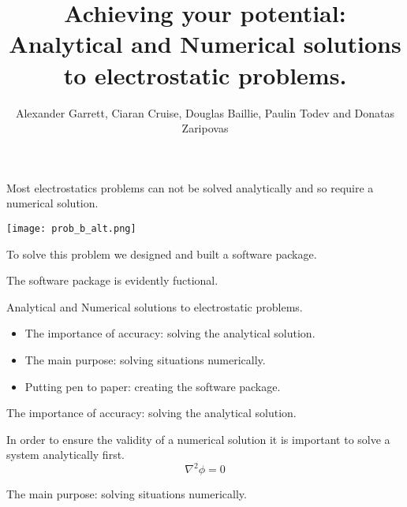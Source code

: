 \documentclass{beamer}
\title{Achieving your potential: Analytical and Numerical solutions to electrostatic problems.}
\author{Alexander Garrett, Ciaran Cruise, Douglas Baillie, Paulin Todev and Donatas Zaripovas}
\begin{document}
\begin{frame}
\titlepage
\end{frame}

\begin{frame}{Most electrostatics problems can not be solved analytically and so require a numerical solution.}
\begin{center}
\texttt{[image: prob\_b\_alt.png]}
\end{center}
\end{frame}

\begin{frame}{To solve this problem we designed and built a software package.}
\end{frame}

\begin{frame}{The software package is evidently fuctional.}
\end{frame}

\begin{frame}{Analytical and Numerical solutions to electrostatic problems.}
\begin{itemize}
\color{darkgray}
\item The importance of accuracy: solving the analytical solution.
\item The main purpose: solving situations numerically.
\item Putting pen to paper: creating the software package.
\end{itemize}
\end{frame}

\begin{frame}
\begin{center}
\color{darkgray}
\huge{The importance of accuracy: solving the analytical solution.}
\end{center}
\end{frame}

\begin{frame}{In order to ensure the validity of a numerical solution it is important to solve a system analytically first.}
\huge
\begin{equation*}
\nabla^2\phi = 0
\end{equation*}
\end{frame}

\begin{frame}
\begin{center}
\color{darkgray}
\huge{The main purpose: solving situations numerically.}
\end{center}
\end{frame}
\end{document}
